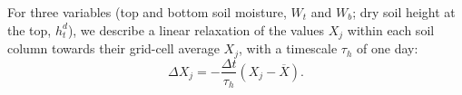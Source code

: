 For three variables (top and bottom soil moisture, $W_t$ and $W_b$; dry soil height at the top, $h_t^d$), we describe a linear relaxation of the values $X_j$ within each soil column towards their grid-cell average $X_j$, with a timescale $\tau_h$ of one day:
\begin{equation}\label{eq:hdiff}
\Delta X_j = - \frac{\Delta t}{\tau_h}(X_j-\overline{X}).
\end{equation}
